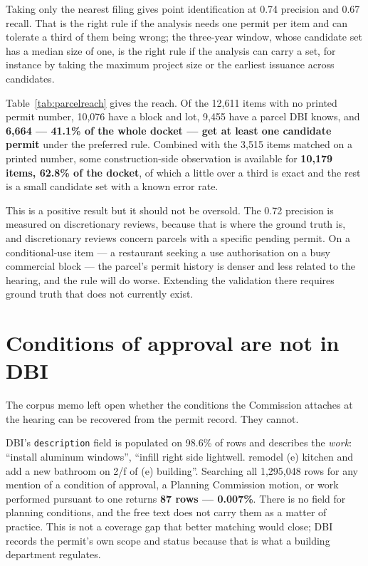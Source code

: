 \documentclass[11pt]{article}
\begin{document}
Taking only the nearest filing gives point identification at 0.74 precision and 0.67 recall.
That is the right rule if the analysis needs one permit per item and can tolerate a third of
them being wrong; the three-year window, whose candidate set has a median size of one, is the right rule if
the analysis can carry a set, for instance by taking the maximum project size or the earliest
issuance across candidates.

Table~\ref{tab:parcelreach} gives the reach. Of the 12{,}611 items with no printed permit
number, 10{,}076 have a block and lot, 9{,}455 have a parcel DBI knows, and \textbf{6{,}664
--- 41.1\% of the whole docket --- get at least one candidate permit} under the preferred
rule. Combined with the 3{,}515 items matched on a printed number, some construction-side
observation is available for \textbf{10{,}179 items, 62.8\% of the docket}, of which a little
over a third is exact and the rest is a small candidate set with a known error rate.

This is a positive result but it should not be oversold. The 0.72 precision is measured on
discretionary reviews, because that is where the ground truth is, and discretionary reviews
concern parcels with a specific pending permit. On a conditional-use item --- a restaurant
seeking a use authorisation on a busy commercial block --- the parcel's permit history is
denser and less related to the hearing, and the rule will do worse. Extending the validation
there requires ground truth that does not currently exist.

\section{Conditions of approval are not in DBI}

The corpus memo left open whether the conditions the Commission attaches at the hearing can be
recovered from the permit record. They cannot.

DBI's \texttt{description} field is populated on 98.6\% of rows and describes the
\emph{work}: ``install aluminum windows'', ``infill right side lightwell. remodel (e) kitchen
and add a new bathroom on 2/f of (e) building''. Searching all
1{,}295{,}048 rows for any mention of a condition of approval, a Planning Commission motion,
or work performed pursuant to one returns \textbf{87 rows --- 0.007\%}. There is no field for
planning conditions, and the free text does not carry them as a matter of practice. This is
not a coverage gap that better matching would close; DBI records the permit's own scope and
status because that is what a building department regulates.
\end{document}
